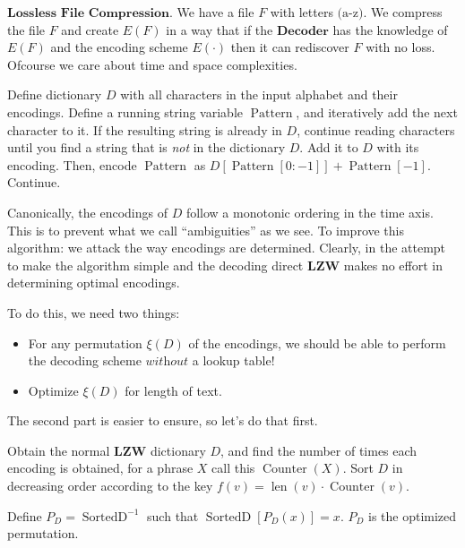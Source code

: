 \documentclass[scrartcl]{article}
\begin{document}
\begin{context}
    $\textbf{Lossless File Compression}$. We have a file $F$ with letters $\text{(a-z)}$. We compress the file $F$ and create $E(F)$ in a way that if the $\textbf{Decoder}$ has the knowledge of $E(F)$ and the encoding scheme $E(\cdot)$ then it can rediscover $F$ with no loss. Ofcourse we care about time and space complexities. 
\end{context}
\begin{proposition*}
    Define dictionary $D$ with all characters in the input alphabet and their encodings. Define a running string variable $\operatorname{Pattern}$, and iteratively add the next character to it. If the resulting string is already in $D$, continue reading characters until you find a string that is \textit{not} in the dictionary $D$. Add it to $D$ with its encoding. Then, encode $\operatorname{Pattern}$ as $D[\operatorname{Pattern}[0:-1]] + \operatorname{Pattern}[-1]$. Continue.
\end{proposition*}
\begin{example*}
    \newline
    \newline

\end{example*}
Canonically, the encodings of $D$ follow a monotonic ordering in the time axis. This is to prevent what we call ``ambiguities'' as we see.
To improve this algorithm: we attack the way encodings are determined. Clearly, in the attempt to make the algorithm simple and the decoding direct $\textbf{LZW}$ makes no effort in determining optimal encodings.
\newpage

To do this, we need two things: 
\begin{itemize}
    \item For any permutation $\xi(D)$ of the encodings, we should be able to perform the decoding scheme $\textit{without}$ a lookup table!
    \item Optimize $\xi(D)$ for length of text. 
\end{itemize}
The second part is easier to ensure, so let's do that first.

\begin{proposition*}
    Obtain the normal $\textbf{LZW}$ dictionary $D$, and find the number of times each encoding is obtained, for a phrase $X$
    call this $\operatorname{Counter}(X)$. Sort $D$ in decreasing order according to the key $f(v) = \operatorname{len}(v)\cdot\operatorname{Counter}(v)$. \newline

    Define $P_D = \operatorname{SortedD}^{-1}$ such that $\operatorname{SortedD}[P_D(x)] = x$. $P_D$ is the optimized permutation.
\end{proposition*}
\end{document}
